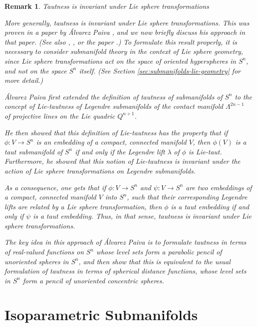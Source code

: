 \documentclass[12pt]{article}
\newtheorem{remark}{Remark}[section]
\begin{document}
\begin{remark}{Tautness is invariant under Lie sphere transformations}
\label{rem:tautness-Lie-invariant}

\noindent
{\rm More generally, tautness is invariant under Lie sphere transformations.  This was proven in a paper
by \'{A}lvarez Paiva \cite{Alv}, and we now briefly discuss his approach in that paper.
(See also \cite[pp. 82-95]{Cec9}, \cite[pp. 224--231]{CR8}, or the paper \cite{Cec-lie-taut}.)
To formulate this result properly, it is necessary to consider submanifold theory in the context of Lie sphere geometry, since Lie sphere transformations act on the space of oriented hyperspheres in $S^n$, and not on the space $S^n$ itself.  
(See Section \ref{sec:submanifolds-lie-geometry} for more detail.)


\'{A}lvarez Paiva \cite{Alv} first extended
the definition of tautness of submanifolds of $S^n$ to 
the concept of Lie-tautness of Legendre submanifolds of the contact manifold 
$\Lambda^{2n-1}$ of projective lines on the Lie quadric $Q^{n+1}$.

He then showed that this definition of Lie-tautness has the property that if $\phi:V \rightarrow S^n$ is an embedding of a compact, connected manifold $V$, then $\phi(V)$ is a taut submanifold of $S^n$ if and only if the Legendre lift $\lambda$
of $\phi$ is Lie-taut. Furthermore, he showed that
this notion of Lie-tautness is invariant under the action of Lie sphere transformations on Legendre submanifolds.  

As a consequence, one gets that
if $\phi:V \rightarrow S^n$ and $\psi:V \rightarrow S^n$ are two embeddings of a compact, connected  
manifold $V$ into $S^n$, 
such that their corresponding Legendre lifts are related by a Lie sphere transformation,
then $\phi$ is a taut embedding if and only if $\psi$ is a taut embedding.  Thus, in that sense, tautness is invariant under Lie sphere transformations.

The key idea in this approach of \'{A}lvarez Paiva \cite{Alv} is to formulate tautness in terms of real-valued
functions on $S^n$ whose level sets form a parabolic pencil 
of unoriented spheres in $S^n$, and then show that this is equivalent to the usual formulation 
of tautness in terms of spherical distance functions, whose level sets in $S^n$ form a pencil of unoriented concentric spheres.}
\end{remark}

\section{Isoparametric Submanifolds}
\label{sec:isoparametric-submanifolds}
\end{document}
